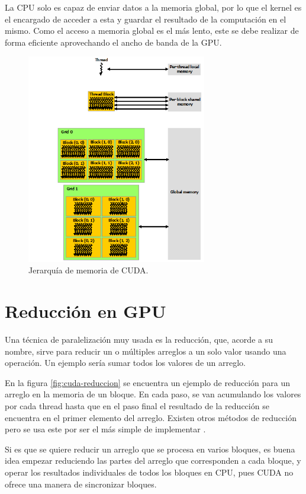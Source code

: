 La CPU solo es capaz de enviar datos a la memoria global, por lo que el kernel es el encargado de acceder a esta y guardar el resultado de la computación en el mismo. Como el acceso a memoria global es el más lento, este se debe realizar de forma eficiente aprovechando el ancho de banda de la GPU.
\begin{figure}[H]
    \centering
    \includegraphics[width=0.7\textwidth]{figs/cuda-memoria.png}
    \caption{Jerarquía de memoria de CUDA.}
    \label{fig:cuda-memoria}
\end{figure}

\section{Reducción en GPU}\label{sev:reduccion}
Una técnica de paralelización muy usada es la reducción, que, acorde a su nombre, sirve para reducir un o múltiples arreglos a un solo valor usando una operación. Un ejemplo sería sumar todos los valores de un arreglo.

En la figura \ref{fig:cuda-reduccion} se encuentra un ejemplo de reducción para un arreglo en la memoria de un bloque. En cada paso, se van acumulando los valores por cada thread hasta que en el paso final el resultado de la reducción se encuentra en el primer elemento del arreglo. Existen otros métodos de reducción pero se usa este por ser el más simple de implementar \cite{harris-reduction}.

Si es que se quiere reducir un arreglo que se procesa en varios bloques, es buena idea empezar reduciendo las partes del arreglo que corresponden a cada bloque, y operar los resultados individuales de todos los bloques en CPU, pues CUDA no ofrece una manera de sincronizar bloques.

